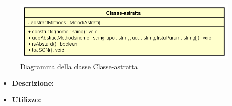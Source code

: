 \begin{figure}[h!]
	\centering
	\includegraphics[scale=0.8]{res/sections/SpecificaFrontEnd/Services/Disegnetti/classe-astratta.png}
	\caption{Diagramma della classe Classe-astratta}
\end{figure}

\begin{itemize}
	\item \textbf{Descrizione:}\\
	
	\item \textbf{Utilizzo:}\\
	

\end{itemize}
